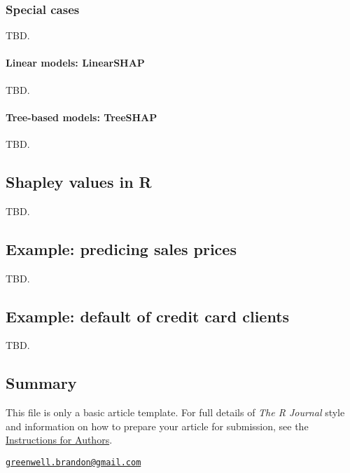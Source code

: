 \hypertarget{special-cases}{%
\subsubsection{Special cases}\label{special-cases}}

TBD.

\hypertarget{linear-models-linearshap}{%
\paragraph{Linear models: LinearSHAP}\label{linear-models-linearshap}}

TBD.

\hypertarget{tree-based-models-treeshap}{%
\paragraph{Tree-based models:
TreeSHAP}\label{tree-based-models-treeshap}}

TBD.

\hypertarget{shapley-values-in-r}{%
\subsection{Shapley values in R}\label{shapley-values-in-r}}

TBD.

\hypertarget{example-predicing-sales-prices}{%
\subsection{Example: predicing sales
prices}\label{example-predicing-sales-prices}}

TBD.

\hypertarget{example-default-of-credit-card-clients}{%
\subsection{Example: default of credit card
clients}\label{example-default-of-credit-card-clients}}

TBD.

\hypertarget{summary}{%
\subsection{Summary}\label{summary}}

This file is only a basic article template. For full details of
\emph{The R Journal} style and information on how to prepare your
article for submission, see the
\href{https://journal.r-project.org/share/author-guide.pdf}{Instructions
for Authors}.




\address{%
Brandon M. Greenwell\\
University of Cincinnati\\
2925 Campus Green Dr\\ Cincinnati, OH 45221\\ United States of America\\ ORCiD---\href{https://orcid.org/0000-0002-8120-0084}{0000-0002-8120-0084}\\
}
\href{mailto:greenwell.brandon@gmail.com}{\nolinkurl{greenwell.brandon@gmail.com}}

